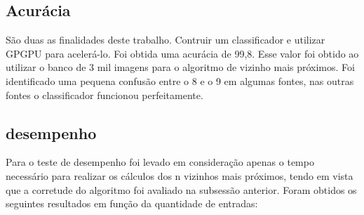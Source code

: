 \documentclass[letterpaper, 10 pt, conference]{ieeeconf}  %
\begin{document}
\subsection{Acurácia}
São duas as finalidades deste trabalho. Contruir um classificador e utilizar
GPGPU para acelerá-lo. Foi obtida uma acurácia de 99,8. Esse valor foi obtido ao
utilizar o banco de 3 mil imagens para o algoritmo de vizinho mais próximos. Foi
identificado uma pequena confusão entre o 8 e o 9 em algumas fontes, nas outras
fontes o classificador funcionou perfeitamente.

\subsection{desempenho}
Para o teste de desempenho foi levado em consideração apenas o tempo necessário
para realizar os cálculos dos n vizinhos mais próximos, tendo em vista que a
corretude do algoritmo foi avaliado na subsessão anterior.
Foram obtidos os seguintes resultados em função da quantidade de entradas:
\end{document}
